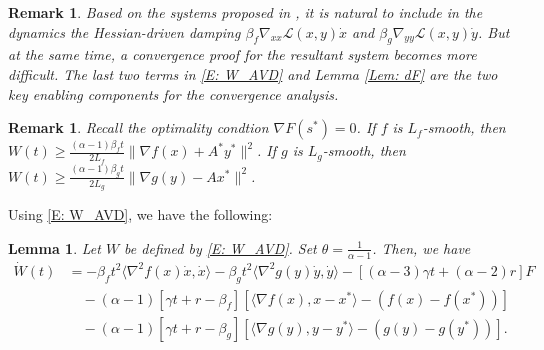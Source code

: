 \documentclass[pdflatex,sn-mathphys-num]{sn-jnl}
\theoremstyle{thmstyleone}
\newtheorem{lemma}[theorem]{Lemma}
\theoremstyle{thmstyletwo}
\newtheorem{remark}[theorem]{Remark}
\theoremstyle{thmstylethree}
\begin{document}
\begin{remark}
Based on the systems proposed in \cite{Zeng_2020,Ding_2025,He_2024_bilinear,He_2026_bilinear}, it is natural to include in the dynamics the Hessian-driven damping $\beta_f\nabla_{xx}\mathcal{L}(x,y)\dot{x}$ and $\beta_g\nabla_{yy}\mathcal{L}(x,y)\dot{y}$. But at the same time, a convergence proof for the resultant system becomes more difficult. The last two terms in \eqref{E: W_AVD} and Lemma \ref{Lem: dF} are the two key enabling components for the convergence analysis.   
\end{remark}

\begin{remark} \label{R:smooth}
Recall the optimality condtion $\nabla F(s^*)=0$. If $f$ is $L_f$-smooth, then $W(t)\ge \frac{(\alpha-1)\beta_ft}{2L_f}\|\nabla f(x)+A^*y^*\|^2$. If $g$ is $L_g$-smooth, then $W(t)\ge \frac{(\alpha-1)\beta_gt}{2L_g}\|\nabla g(y)-Ax^*\|^2$.    
\end{remark}

Using \eqref{E: W_AVD}, we have the following:


\begin{lemma}\label{Lem: W_bound_AVD}
Let $W$ be defined by \eqref{E: W_AVD}. Set $\theta = \frac{1}{\alpha-1}$. Then, we have
\begin{align*}
\dot{W}(t)
&= - \beta_f t^2 \langle \nabla^2 f(x)\dot{x}, \dot{x} \rangle 
   - \beta_g t^2 \langle \nabla^2 g(y)\dot{y}, \dot{y} \rangle 
   - [ (\alpha-3)\gamma t + (\alpha-2)r ] F \\
&\quad - (\alpha-1)[ \gamma t + r-\beta_f  ] \left[\langle \nabla f(x), x-x^* \rangle - \left( f(x) - f(x^*) \right) \right] \\
&\quad - (\alpha-1)[ \gamma t + r-\beta_g ] \left[ \langle \nabla g(y), y-y^* \rangle - \left( g(y) - g(y^*) \right) \right].
\end{align*}  
\end{lemma}
\end{document}
